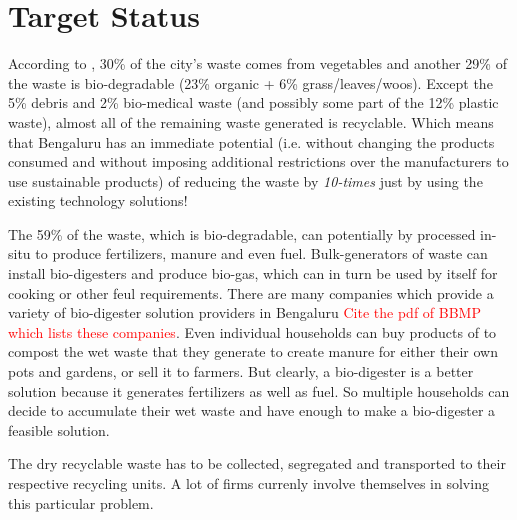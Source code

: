 \documentclass[10pt]{article}
\begin{document}
\section{Target Status}

According to \cite{BBMP:cityStatistics}, 30\% of the city's waste comes from vegetables and another 29\% of the waste is bio-degradable (23\% organic + 6\% grass/leaves/woos). Except the 5\% debris and 2\% bio-medical waste (and possibly some part of the 12\% plastic waste), almost all of the remaining waste generated is recyclable. Which means that Bengaluru has an immediate potential (i.e. without changing the products consumed and without imposing additional restrictions over the manufacturers to use sustainable products) of reducing the waste by \emph{10-times} just by using the existing technology solutions!

The 59\% of the waste, which is bio-degradable, can potentially by processed in-situ to produce fertilizers, manure and even fuel. Bulk-generators of waste can install bio-digesters and produce bio-gas, which can in turn be used by itself for cooking or other feul requirements. There are many companies which provide a variety of bio-digester solution providers in Bengaluru \textcolor{red}{Cite the pdf of BBMP which lists these companies}. Even individual households can buy products of \cite{DailyDump:about} to compost the wet waste that they generate to create manure for either their own pots and gardens, or sell it to farmers. But clearly, a bio-digester is a better solution because it generates fertilizers as well as fuel. So multiple households can decide to accumulate their wet waste and have enough to make a bio-digester a feasible solution.

The dry recyclable waste has to be collected, segregated and transported to their respective recycling units. A lot of firms currenly involve themselves in solving this particular problem. 





\end{document}
